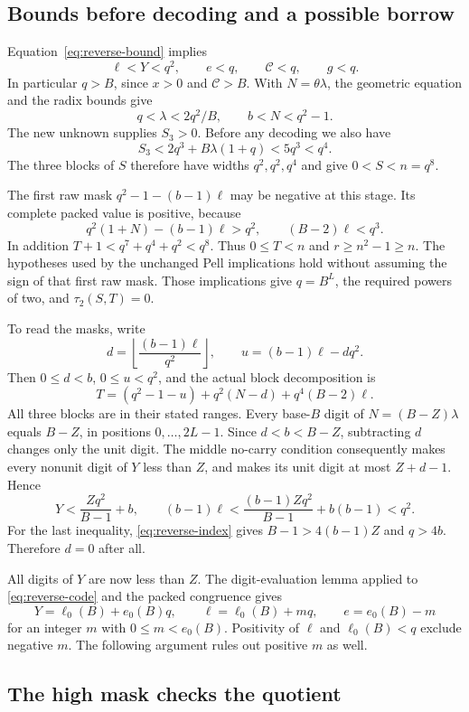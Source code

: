 \subsection{Bounds before decoding and a possible borrow}

Equation~\eqref{eq:reverse-bound} implies
\[
 \ell<Y<q^2,\qquad e<q,\qquad \mathcal C<q,\qquad g<q.
\]
In particular $q>B$, since $x>0$ and $\mathcal C>B$. With
$N=\theta\lambda$, the geometric equation and the radix bounds give
\[
 q<\lambda<2q^2/B,\qquad b<N<q^2-1.
\]
The new unknown supplies $S_3>0$. Before any decoding we also have
\[
 S_3<2q^3+B\lambda(1+q)<5q^3<q^4.
\]
The three blocks of $S$ therefore have widths $q^2,q^2,q^4$ and give
$0<S<n=q^8$.

The first raw mask $q^2-1-(b-1)\ell$ may be negative at this stage.
Its complete packed value is positive, because
\[
 q^2(1+N)-(b-1)\ell>q^2,
 \qquad (B-2)\ell<q^3.
\]
In addition $T+1<q^7+q^4+q^2<q^8$. Thus $0\le T<n$ and
$r\ge n^2-1\ge n$. The hypotheses used by the unchanged Pell
implications hold without assuming the sign of that first raw mask.
Those implications give $q=B^L$, the required powers of two, and
$\tau_2(S,T)=0$.

To read the masks, write
\[
 d=\left\lfloor\frac{(b-1)\ell}{q^2}\right\rfloor,
 \qquad u=(b-1)\ell-dq^2.
\]
Then $0\le d<b$, $0\le u<q^2$, and the actual block decomposition is
\[
 T=(q^2-1-u)+q^2(N-d)+q^4(B-2)\ell.
\]
All three blocks are in their stated ranges. Every base-$B$ digit of
$N=(B-Z)\lambda$ equals $B-Z$, in positions $0,\ldots,2L-1$.
Since $d<b<B-Z$, subtracting $d$ changes only the unit digit. The middle
no-carry condition consequently makes every nonunit digit of $Y$ less
than $Z$, and makes its unit digit at most $Z+d-1$. Hence
\[
 Y<\frac{Zq^2}{B-1}+b,
 \qquad
 (b-1)\ell<\frac{(b-1)Zq^2}{B-1}+b(b-1)<q^2.
\]
For the last inequality, \eqref{eq:reverse-index} gives
$B-1>4(b-1)Z$ and $q>4b$. Therefore $d=0$ after all.

All digits of $Y$ are now less than $Z$. The digit-evaluation lemma
applied to \eqref{eq:reverse-code} and the packed congruence gives
\begin{equation}\label{eq:reverse-quotient}
 Y=\ell_0(B)+e_0(B)q,\qquad
 \ell=\ell_0(B)+mq,\qquad e=e_0(B)-m
\end{equation}
for an integer $m$ with $0\le m<e_0(B)$. Positivity of $\ell$ and
$\ell_0(B)<q$ exclude negative $m$. The following argument rules out
positive $m$ as well.

\subsection{The high mask checks the quotient}

